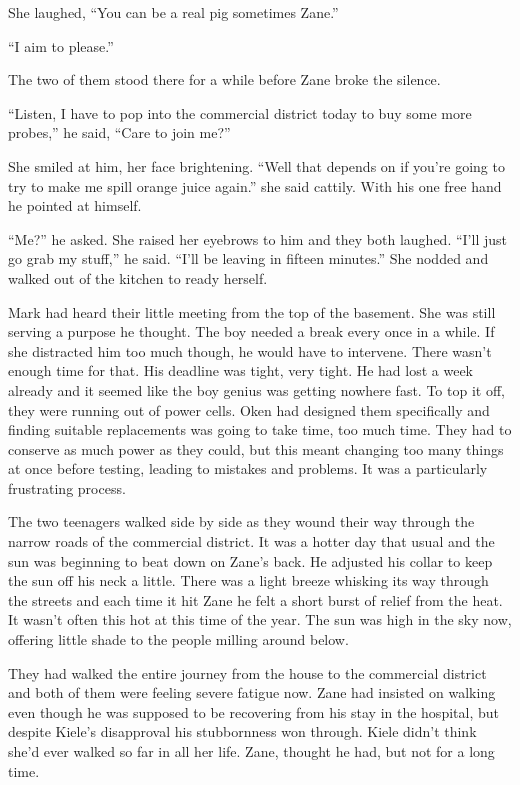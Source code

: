 She laughed, ``You can be a real pig sometimes Zane.''

``I aim to please.''

The two of them stood there for a while before Zane broke the silence.

``Listen, I have to pop into the commercial district today to buy some more probes,'' he said, ``Care to join me?''

She smiled at him, her face brightening.  ``Well that depends on if you're going to try to make me spill orange juice again.'' she said cattily.  With his one free hand he pointed at himself.  

``Me?'' he asked.  She raised her eyebrows to him and they both laughed.  ``I'll just go grab my stuff,'' he said.  ``I'll be leaving in fifteen minutes.''  She nodded and walked out of the kitchen to ready herself. 

Mark had heard their little meeting from the top of the basement.  She was still serving a purpose he thought.  The boy needed a break every once in a while.  If she distracted him too much though, he would have to intervene.  There wasn't enough time for that.  His deadline was tight, very tight.  He had lost a week already and it seemed like the boy genius was getting nowhere fast.  To top it off, they were running out of power cells.  Oken had designed them specifically and finding suitable replacements was going to take time, too much time.  They had to conserve as much power as they could, but this meant changing too many things at once before testing, leading to mistakes and problems.  It was a particularly frustrating process.



\thoughtbreak



The two teenagers walked side by side as they wound their way through the narrow roads of the commercial district.  It was a hotter day that usual and the sun was beginning to beat down on Zane's back.  He adjusted his collar to keep the sun off his neck a little.  There was a light breeze whisking its way through the streets and each time it hit Zane he felt a short burst of relief from the heat.  It wasn't often this hot at this time of the year.  The sun was high in the sky now, offering little shade to the people milling around below.

They had walked the entire journey from the house to the commercial district and both of them were feeling severe fatigue now.  Zane had insisted on walking even though he was supposed to be recovering from his stay in the hospital, but despite Kiele's disapproval his stubbornness won through.  Kiele didn't think she'd ever walked so far in all her life.  Zane, thought he had, but not for a long time.  

